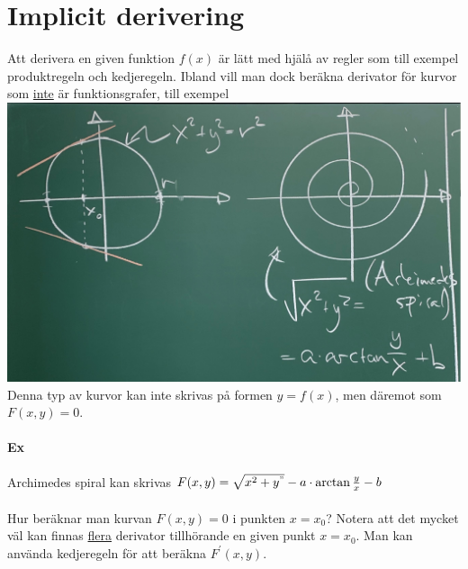 \section{Implicit derivering}
Att derivera en given funktion $f(x)$ är lätt med hjälå av regler som till exempel produktregeln och kedjeregeln.
Ibland vill man dock beräkna derivator för kurvor som \underline{inte} är funktionsgrafer,
till exempel\\
\includegraphics[scale=0.1]{lessons/lesson08/imgs/img01.jpg}\\
Denna typ av kurvor kan inte skrivas på formen $y=f(x)$,
men däremot som $F(x,y)=0$.

\paragraph{Ex} Archimedes spiral kan skrivas $F(x,y)=\sqrt{x^2+y^"}-a\cdot \arctan{\frac{y}{x}}-b$\\
\\
Hur beräknar man kurvan $F(x,y)=0$ i punkten $x=x_0$?
Notera att det mycket väl kan finnas \underline{flera} derivator tillhörande en given punkt $x=x_0$.
Man kan använda kedjeregeln för att beräkna $F^\prime(x,y)$.


